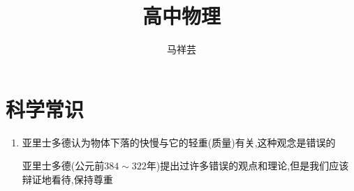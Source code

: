 \documentclass{article}
\title{高中物理}
\author{马祥芸}
\begin{document}
\maketitle
\tableofcontents
{}
\newpage

\section{科学常识}
\begin{enumerate}
    \item 亚里士多德认为物体下落的快慢与它的轻重(质量)有关,这种观念是错误的

          \vspace{-1em}

          \hspace{-0.9em}\begin{adjustbox}{minipage=0.86\linewidth, bgcolor=gray!20, padding=1em}
              \small %
              亚里士多德(公元前$384\sim322$年)提出过许多错误的观点和理论,但是我们应该辩证地看待,保持尊重
          \end{adjustbox}

          \vspace{-1em}


\end{enumerate}
\end{document}
